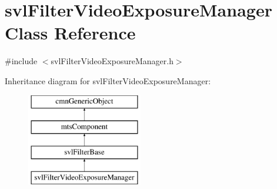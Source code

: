 \hypertarget{classsvl_filter_video_exposure_manager}{}\section{svl\+Filter\+Video\+Exposure\+Manager Class Reference}
\label{classsvl_filter_video_exposure_manager}


{\ttfamily \#include $<$svl\+Filter\+Video\+Exposure\+Manager.\+h$>$}

Inheritance diagram for svl\+Filter\+Video\+Exposure\+Manager\+:\begin{figure}[H]
\begin{center}
\leavevmode
\includegraphics[height=4.000000cm]{d9/d7a/classsvl_filter_video_exposure_manager}
\end{center}
\end{figure}
